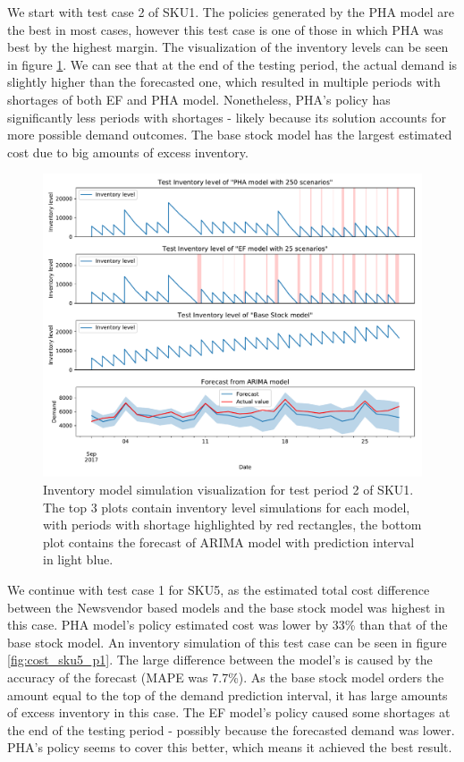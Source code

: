 \documentclass[11pt,a4paper]{article}
\begin{document}
\newpage
We start with test case 2 of SKU1. The policies generated by the PHA model are the best in most cases, however this test case is one of those in which PHA was best by the highest margin. The visualization of the inventory levels can be seen in figure \ref{fig:cost_sku1_p2}.
We can see that at the end of the testing period, the actual demand is slightly higher than the forecasted one, which resulted in multiple periods with shortages of both EF and PHA model. Nonetheless, PHA's policy has significantly less periods with shortages - likely because its solution accounts for more possible demand outcomes. The base stock model has the largest estimated cost due to big amounts of excess inventory.

\begin{figure}
  \includegraphics[width=1\linewidth]{figures/cost_sku1_2.pdf}
  \caption[Inventory model simulation visualization for test period 2 of SKU1]{Inventory model simulation visualization for test period 2 of SKU1. The top 3 plots contain inventory level simulations for each model, with periods with shortage highlighted by red rectangles, the bottom plot contains the forecast of ARIMA model with prediction interval in light blue.}
  \label{fig:cost_sku1_p2}
\end{figure}

\newpage


\newpage
We continue with test case 1 for SKU5, as the estimated total cost difference between the Newsvendor based models and the base stock model was highest in this case. PHA model's policy estimated cost was lower by 33\% than that of the base stock model. An inventory simulation of this test case can be seen in figure \ref{fig:cost_sku5_p1}. The large difference between the model's is caused by the accuracy of the forecast (MAPE was 7.7\%). As the base stock model orders the amount equal to the top of the demand prediction interval, it has large amounts of excess inventory in this case. The EF model's policy caused some shortages at the end of the testing period - possibly because the forecasted demand was lower. PHA's policy seems to cover this better, which means it achieved the best result.
\end{document}
